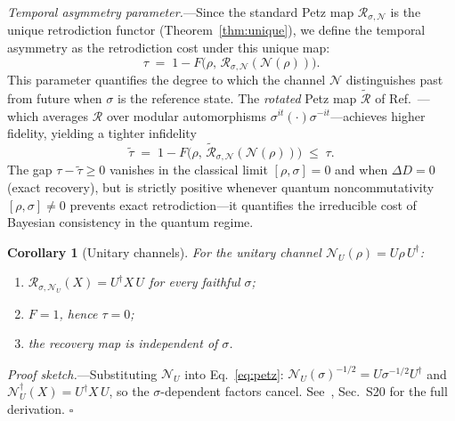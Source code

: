 \documentclass[prl,twocolumn,superscriptaddress,longbibliography,floatfix]{revtex4-2}
\newtheorem{corollary}[theorem]{Corollary}
\newcommand{\Petz}{\mathcal{R}}
\newcommand{\chan}{\mathcal{N}}
\newcommand{\tauasym}{\tau}
\newcommand{\taurot}{\tilde{\tau}}
\begin{document}
\emph{Temporal asymmetry parameter.}---Since the standard Petz
map $\Petz_{\sigma,\chan}$ is the unique retrodiction functor
(Theorem~\ref{thm:unique}), we define the temporal asymmetry
as the retrodiction cost under this unique map:
\begin{equation}
\tauasym \;=\; 1 - F\!\big(\rho,\,
  \Petz_{\sigma,\chan}(\chan(\rho))\big).
\label{eq:tau}
\end{equation}
This parameter quantifies the degree to which the channel $\chan$
distinguishes past from future when $\sigma$ is the reference state.
The \emph{rotated} Petz map $\tilde{\Petz}$ of
Ref.~\cite{Junge2018}---which averages $\Petz$ over modular
automorphisms $\sigma^{it}(\cdot)\sigma^{-it}$---achieves
higher fidelity, yielding a tighter infidelity
\begin{equation}
\taurot \;=\; 1 - F\!\big(\rho,\,
  \tilde{\Petz}_{\sigma,\chan}(\chan(\rho))\big)
  \;\leq\; \tauasym.
\label{eq:taurot}
\end{equation}
The gap $\tauasym - \taurot \geq 0$ vanishes in the classical
limit $[\rho,\sigma] = 0$ and when $\Delta D = 0$ (exact recovery),
but is strictly positive whenever quantum noncommutativity
$[\rho,\sigma] \neq 0$ prevents exact retrodiction---it quantifies
the irreducible cost of Bayesian consistency in the quantum regime.
\begin{corollary}[Unitary channels]
\label{cor:unitary}
For the unitary channel $\chan_U(\rho) = U\rho\, U^\dagger$:
\begin{enumerate}
\item[\emph{(a)}] $\Petz_{\sigma,\chan_U}(X) = U^\dagger X\, U$
  for every faithful $\sigma$;
\item[\emph{(b)}] $F = 1$, hence $\tauasym = 0$;
\item[\emph{(c)}] the recovery map is independent of $\sigma$.
\end{enumerate}
\end{corollary}
\emph{Proof sketch.}---Substituting $\chan_U$ into
Eq.~\eqref{eq:petz}: $\chan_U(\sigma)^{-1/2} = U\sigma^{-1/2}U^\dagger$
and $\chan_U^\dagger(X) = U^\dagger X\, U$, so the $\sigma$-dependent
factors cancel.
See~\cite{SM}, Sec.~S20 for the full derivation. \hfill$\square$
\end{document}
